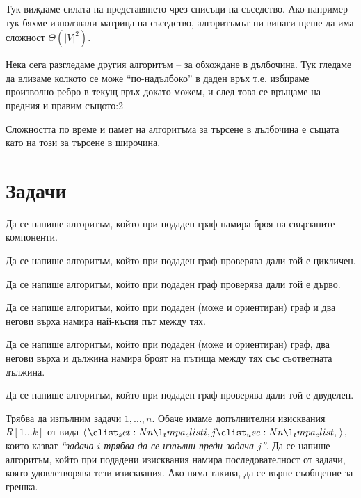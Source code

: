 Тук виждаме силата на представянето чрез списъци на съседство.
Ако например тук бяхме използвали матрица на съседство, алгоритъмът ни винаги щеше да има сложност $\Theta(|V|^2)$.

Нека сега разгледаме другия алгоритъм -- за обхождане в дълбочина.
Тук гледаме да влизаме колкото се може ``по-надълбоко'' в даден връх т.е. избираме произволно ребро в текущ връх докато можем, и след това се връщаме на предния и правим същото:2



Сложността по време и памет на алгоритъма за търсене в дълбочина е същата като на този за търсене в широчина.

\section{Задачи}

\begin{problem}
Да се напише алгоритъм, който при подаден граф намира броя на свързаните компоненти.
\end{problem}

\begin{problem}
Да се напише алгоритъм, който при подаден граф проверява дали той е цикличен.
\end{problem}

\begin{problem}
Да се напише алгоритъм, който при подаден граф проверява дали той е дърво.
\end{problem}

\begin{problem}
Да се напише алгоритъм, който при подаден (може и ориентиран) граф и два негови върха намира най-късия път между тях.
\end{problem}

\begin{problem}
Да се напише алгоритъм, който при подаден (може и ориентиран) граф, два негови върха и дължина намира броят на пътища между тях със съответната дължина.
\end{problem}

\begin{problem}
Да се напише алгоритъм, който при подаден граф проверява дали той е двуделен.
\end{problem}

\begin{problem}
Трябва да изпълним задачи $1, \dots, n$.
Обаче имаме допълнителни изисквания $R[1 \dots k]$ от вида $\opair{i, j}$, които казват \textit{``задача $i$ трябва да се изпълни преди задача $j$''}.
Да се напише алгоритъм, който при подадени изисквания намира последователност от задачи, която удовлетворява тези изисквания.
Ако няма такива, да се върне съобщение за грешка.
\end{problem}

